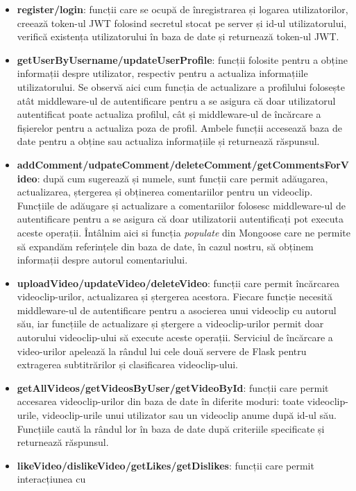 \begin{itemize}
    \item \textbf{register/login}: funcții care se ocupă de înregistrarea și logarea utilizatorilor,
    creează token-ul JWT folosind secretul stocat pe server și id-ul utilizatorului, verifică
    existența utilizatorului în baza de date și returnează token-ul JWT.
    \item \textbf{getUserByUsername/updateUserProfile}: funcții folosite pentru a obține informații
    despre utilizator, respectiv pentru a actualiza informațiile utilizatorului. Se observă aici
    cum funcția de actualizare a profilului folosește atât middleware-ul de autentificare pentru a
    se asigura că doar utilizatorul autentificat poate actualiza profilul, cât și middleware-ul
    de încărcare a fișierelor pentru a actualiza poza de profil. Ambele funcții accesează baza de
    date pentru a obține sau actualiza informațiile și returnează răspunsul.
    \item \textbf{addComment/udpateComment/deleteComment/getCommentsForVideo}: după cum sugerează
    și numele, sunt funcții care permit adăugarea, actualizarea, ștergerea și obținerea comentariilor
    pentru un videoclip. Funcțiile de adăugare și actualizare a comentariilor folosesc middleware-ul
    de autentificare pentru a se asigura că doar utilizatorii autentificați pot executa aceste operații.
    Întâlnim aici si funcția \textit{populate} din Mongoose care ne permite să expandăm referințele
    din baza de date, în cazul nostru, să obținem informații despre autorul comentariului.
    \item \textbf{uploadVideo/updateVideo/deleteVideo}: funcții care permit încărcarea videoclip-urilor,
    actualizarea și ștergerea acestora. Fiecare funcție necesită middleware-ul de autentificare pentru
    a asocierea unui videoclip cu autorul său, iar funcțiile de actualizare și ștergere a videoclip-urilor
    permit doar autorului videoclip-ului să execute aceste operații. Serviciul de încărcare a video-urilor
    apelează la rândul lui cele două servere de Flask pentru extragerea subtitrărilor și clasificarea
    videoclip-ului.
    \item \textbf{getAllVideos/getVideosByUser/getVideoById}: funcții care permit accesarea videoclip-urilor
    din baza de date în diferite moduri: toate videoclip-urile, videoclip-urile unui utilizator sau un
    videoclip anume după id-ul său. Funcțiile caută la rândul lor în baza de date după criteriile
    specificate și returnează răspunsul.
    \item \textbf{likeVideo/dislikeVideo/getLikes/getDislikes}: funcții care permit interacțiunea cu 

\end{itemize}
